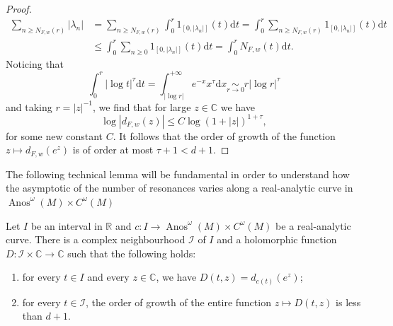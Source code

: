 \documentclass[AHL,Unicode,longabstracts,published]{cedram}
\DeclareMathOperator{\Anos}{Anos}
\newcommand{\clI}{\mathcal{I}}
\newcommand{\bbC}{\mathbb{C}}
\newcommand{\bbR}{\mathbb{R}}
\newcommand{\rmd}{\mathrm{d}}
\newcommand*{\romanenumi}{\renewcommand*{\theenumi}{\roman{enumi}}}
\begin{document}
\begin{proof}
\begin{equation*}
\begin{split}
\sum_{n \geq N_{F,w}(r)}|\lambda_n| & = \sum_{n \geq N_{F,w}(r)} \int_0^r 1_{[0,|\lambda_n|]}(t) \rmd t = \int_0^r \sum_{n \geq N_{F,w}(r)} 1_{[0,|\lambda_n|]}(t) \rmd t \\
& \leq \int_0^r \sum_{n \geq 0} 1_{[0,|\lambda_n|]}(t) \rmd t = \int_0^r N_{F,w}(t) \rmd t.
\end{split}
\end{equation*}
Noticing that
\begin{equation*}
\int_{0}^r |\log t|^\tau \rmd t = \int_{|\log r|}^{+ \infty} e^{-x}x^\tau \rmd x \underset{r \to 0}{\sim} r|\log r|^\tau
\end{equation*}
and taking $r = |z|^{-1}$, we find that for large $z \in \bbC$ we have
\begin{equation*}
\log |d_{F,w}(z)| \leq C \log(1 + |z|)^{1+\tau},
\end{equation*}
for some new constant $C$. It follows that the order of growth of the function $z \mapsto d_{F,w}(e^z)$ is of order at most $\tau + 1 < d+1$.
\end{proof}

The following technical lemma will be fundamental in order to understand how the asymptotic of the number of resonances varies along a real-analytic curve in $\Anos^\omega(M) \times C^\omega(M)$

\begin{lemm}\label{lemma:family_determinant}
Let $I$ be an interval in $\bbR$ and $c : I \to \Anos^\omega(M) \times C^\omega(M)$ be a real-analytic curve. There is a complex neighbourhood $\clI $ of $I$ and a holomorphic function $D : \clI \times \bbC \to \bbC$ such that the following holds:
\begin{enumerate}\romanenumi
\item\label{lemm4.9.1} for every $t \in I$ and every $z \in \bbC$, we have $D(t,z) = d_{c(t)}(e^z)$;
\item\label{lemm4.9.2} for every $t \in \clI $, the order of growth of the entire function $z \mapsto D(t,z)$ is less than $d+1$.
\end{enumerate}
\end{lemm}
\end{document}
